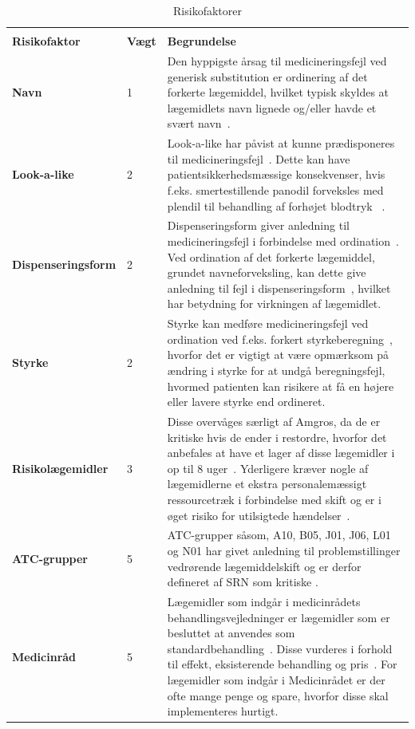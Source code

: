 \begin{longtable}{p{3.5cm}| p{1.0cm} | p{9.2cm}}
	\caption{Risikofaktorer} \vspace{0.2cm}
	\label{table:features} \\
\cellcolor[HTML]{C0C0C0} {\textbf{Risikofaktor}} & \cellcolor[HTML]{C0C0C0} {\textbf{Vægt}} & \cellcolor[HTML]{C0C0C0} {\textbf{Begrundelse}} \\ \hline
\textbf{Navn} & 1 & Den hyppigste årsag til medicineringsfejl ved generisk substitution er ordinering af det forkerte lægemiddel, hvilket typisk skyldes at lægemidlets navn lignede og/eller havde et svært navn~\citep{Hakonsen2010}. \\  \hline 
\textbf{Look-a-like} & 2 & Look-a-like har påvist at kunne prædisponeres til medicineringsfejl~\citep{Wittich2014}. Dette kan have patientsikkerhedsmæssige konsekvenser, hvis f.eks. smertestillende panodil forveksles med plendil til behandling af forhøjet blodtryk ~\citep{DanskSelskabforPatientsikkerhed2009}.\\  \hline 
\textbf{Dispenseringsform} & 2 & Dispenseringsform giver anledning til medicineringsfejl i forbindelse med ordination~\citep{Agrawal2009}. Ved ordination af det forkerte lægemiddel, grundet navneforveksling, kan dette give anledning til fejl i dispenseringsform~\citep{DanskSelskabforPatientsikkerhed2009}, hvilket har betydning for virkningen af lægemidlet.
\\ \hline 
\textbf{Styrke} & 2 & Styrke kan medføre medicineringsfejl ved ordination ved f.eks. forkert styrkeberegning~\citep{Agrawal2009}, hvorfor det er vigtigt at være opmærksom på  ændring i styrke for at undgå beregningsfejl, hvormed patienten kan risikere at få en højere eller lavere styrke end ordineret.\\ \hline
\textbf{Risikolægemidler} & 3 & Disse overvåges særligt af Amgros, da de er kritiske hvis de ender i restordre, hvorfor det anbefales at have et lager af disse lægemidler i op til 8 uger~\citep{Amgros}. Yderligere kræver nogle af lægemidlerne et ekstra personalemæssigt ressourcetræk i forbindelse med skift og er i øget risiko for utilsigtede hændelser~\citep{Amgros}. \\ \hline 
\textbf{ATC-grupper} & 5 & ATC-grupper såsom, A10, B05, J01, J06, L01 og N01 har givet anledning til problemstillinger vedrørende lægemiddelskift og er derfor defineret af SRN som kritiske \citep{SRN}. \\ \hline 
\textbf{Medicinråd} & 5 & Lægemidler som indgår i medicinrådets behandlingsvejledninger er lægemidler som er besluttet at anvendes som standardbehandling~\citep{Medicinradet2018}. Disse vurderes i forhold til effekt, eksisterende behandling og pris~\citep{Medicinradet2018}. For lægemidler som indgår i Medicinrådet er der ofte mange penge og spare, hvorfor disse skal implementeres hurtigt. \\ \hline 
    \end{longtable}


